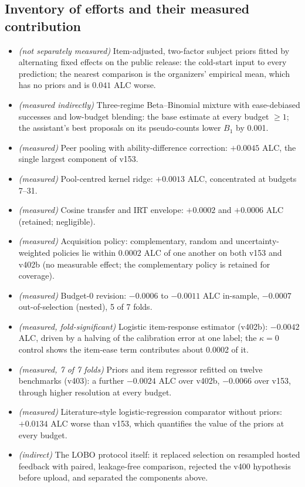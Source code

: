 \documentclass{article}
\begin{document}
\subsection{Inventory of efforts and their measured contribution}
\begin{itemize}\setlength{\itemsep}{1pt}
\item \emph{(not separately measured)} Item-adjusted, two-factor subject priors fitted by alternating fixed effects on the public release: the cold-start input to every prediction; the nearest comparison is the organizers' empirical mean, which has no priors and is $0.041$ ALC worse.
\item \emph{(measured indirectly)} Three-regime Beta--Binomial mixture with ease-debiased successes and low-budget blending: the base estimate at every budget $\ge1$; the assistant's best proposals on its pseudo-counts lower $B_1$ by 0.001.
\item \emph{(measured)} Peer pooling with ability-difference correction: $+0.0045$ ALC, the single largest component of v153.
\item \emph{(measured)} Pool-centred kernel ridge: $+0.0013$ ALC, concentrated at budgets 7--31.
\item \emph{(measured)} Cosine transfer and IRT envelope: $+0.0002$ and $+0.0006$ ALC (retained; negligible).
\item \emph{(measured)} Acquisition policy: complementary, random and uncertainty-weighted policies lie within $0.0002$ ALC of one another on both v153 and v402b (no measurable effect; the complementary policy is retained for coverage).
\item \emph{(measured)} Budget-0 revision: $-0.0006$ to $-0.0011$ ALC in-sample, $-0.0007$ out-of-selection (nested), 5 of 7 folds.
\item \emph{(measured, fold-significant)} Logistic item-response estimator (v402b): $-0.0042$ ALC, driven by a halving of the calibration error at one label; the $\kappa{=}0$ control shows the item-ease term contributes about 0.0002 of it.
\item \emph{(measured, 7 of 7 folds)} Priors and item regressor refitted on twelve benchmarks (v403): a further $-0.0024$ ALC over v402b, $-0.0066$ over v153, through higher resolution at every budget.
\item \emph{(measured)} Literature-style logistic-regression comparator without priors: $+0.0134$ ALC worse than v153, which quantifies the value of the priors at every budget.
\item \emph{(indirect)} The LOBO protocol itself: it replaced selection on resampled hosted feedback with paired, leakage-free comparison, rejected the v400 hypothesis before upload, and separated the components above.

\end{itemize}
\end{document}
